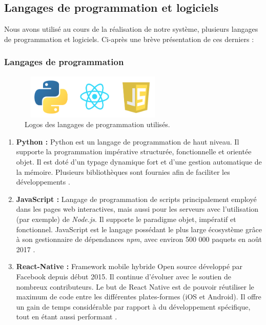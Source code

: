 \subsection{Langages de programmation et logiciels}\label{def-tools}
    Nous avons utilisé au cours de la réalisation de notre système, plusieurs langages de programmation et logiciels. Ci-après une brève présentation de ces derniers :
        \subsubsection{Langages de programmation}\label{react-native-def}
            \begin{figure}[H]
                    \centering
                    \includegraphics[height=60pt,width=200pt]{img/chapter4/tools/language.png}
                    \caption{Logos des langages de programmation utilisés.}
                    \label{}
            \end{figure}
            \begin{enumerate}[leftmargin=*]
                \item{\textbf{Python : }}
                Python est un langage de programmation de haut niveau. Il supporte la programmation impérative structurée, fonctionnelle et orientée objet. Il est doté d'un typage dynamique fort et d'une gestion automatique de la mémoire. Plusieurs bibliothèques sont fournies afin de faciliter les développements \cite{python}.\\

                \item{\textbf{JavaScript : }}
                Langage de programmation de scripts principalement employé dans les pages web interactives, mais aussi pour les serveurs avec l'utilisation (par exemple) de \emph{Node.js}. Il supporte le paradigme objet, impératif et fonctionnel. JavaScript est le langage possédant le plus large écosystème grâce à son gestionnaire de dépendances \emph{npm}, avec environ 500 000 paquets en août 2017 \cite{javascript}.\\

                \item{\textbf{React-Native : }}
                Framework mobile hybride Open source développé par Facebook depuis début 2015. Il continue d'évoluer avec le soutien de nombreux contributeurs. Le but de React Native est de pouvoir réutiliser le maximum de code entre les différentes plates-formes (iOS et Android). Il offre un gain de temps considérable par rapport à du développement spécifique, tout en étant aussi performant \cite{reactnative}.
            \end{enumerate}

